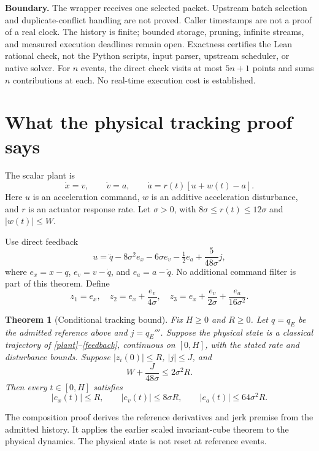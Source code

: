 \documentclass[11pt,letterpaper]{article}
\newtheorem{theorem}{Theorem}
\begin{document}
\textbf{Boundary.} The wrapper receives one selected packet. Upstream batch selection and duplicate-conflict handling are not proved. Caller timestamps are not a proof of a real clock. The history is finite; bounded storage, pruning, infinite streams, and measured execution deadlines remain open. Exactness certifies the Lean rational check, not the Python scripts, input parser, upstream scheduler, or native solver. For $n$ events, the direct check visits at most $5n+1$ points and sums $n$ contributions at each. No real-time execution cost is established.

\newpage
\section{What the physical tracking proof says}
The scalar plant is
\begin{equation}\label{plant}
\dot x=v,\qquad \dot v=a,\qquad \dot a=r(t)[u+w(t)-a].
\end{equation}
Here $u$ is an acceleration command, $w$ is an additive acceleration disturbance, and $r$ is an actuator response rate. Let $\sigma>0$, with $8\sigma\leq r(t)\leq12\sigma$ and $|w(t)|\leq W$.

Use direct feedback
\begin{equation}\label{feedback}
u=\ddot q-8\sigma^2e_x-6\sigma e_v-\tfrac12e_a+\frac{5}{48\sigma}j,
\end{equation}
where $e_x=x-q$, $e_v=v-\dot q$, and $e_a=a-\ddot q$. No additional command filter is part of this theorem. Define
\[
z_1=e_x,\quad z_2=e_x+\frac{e_v}{4\sigma},\quad
z_3=e_x+\frac{e_v}{2\sigma}+\frac{e_a}{16\sigma^2}.
\]
\begin{theorem}[Conditional tracking bound]\label{tracking}
Fix $H\geq0$ and $R\geq0$. Let $q=q_E$ be the admitted reference above and $j=q_E'''$. Suppose the physical state is a classical trajectory of \eqref{plant}--\eqref{feedback}, continuous on $[0,H]$, with the stated rate and disturbance bounds. Suppose $|z_i(0)|\leq R$, $|j|\leq J$, and
\begin{equation}\label{budget}
W+\frac{J}{48\sigma}\leq2\sigma^2R.
\end{equation}
Then every $t\in[0,H]$ satisfies
\[
|e_x(t)|\leq R,\qquad |e_v(t)|\leq8\sigma R,\qquad
|e_a(t)|\leq64\sigma^2R.
\]
\end{theorem}
The composition proof derives the reference derivatives and jerk premise from the admitted history. It applies the earlier scaled invariant-cube theorem to the physical dynamics. The physical state is not reset at reference events.
\end{document}
